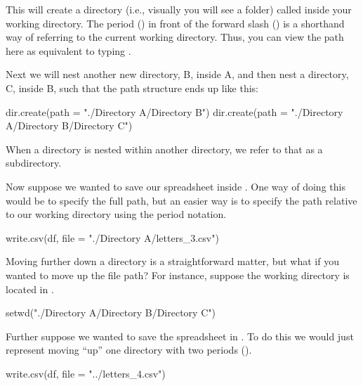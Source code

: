\noindent
This will create a directory (i.e., visually you will see a folder) called  inside your working directory. The period () in front of the forward slash (\R{/}) is a shorthand way of referring to the current working directory. Thus, you can view the path here as equivalent to typing .

Next we will nest another new directory, B, inside A, and then nest a directory, C, inside B, such that the path structure ends up like this:

\vspace{1em}


\begin{inR}
dir.create(path = "./Directory A/Directory B")
dir.create(path = "./Directory A/Directory B/Directory C")
\end{inR}

\medskip
\noindent
When a directory is nested within another directory, we refer to that as a \gls{subdirectory}.

Now suppose we wanted to save our spreadsheet inside . One way of doing this would be to specify the full path, but an easier way is to specify the path relative to our working directory using the period notation.

\begin{inR}
write.csv(df, file = "./Directory A/letters_3.csv")
\end{inR}

\vspace{2em}


Moving further down a directory is a straightforward matter, but what if you wanted to move up the file path? For instance, suppose the working directory is located in .

\begin{inR}
setwd("./Directory A/Directory B/Directory C")
\end{inR}

\medskip

\noindent Further suppose we wanted to save the spreadsheet in .  To do this we would just represent moving ``up'' one directory with two periods ().

\begin{inR}
write.csv(df, file = "../letters_4.csv")
\end{inR}

